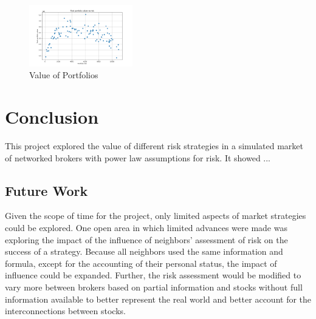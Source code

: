 \documentclass[letterpaper, 10 pt, proceedings]{ieeetran}
\begin{document}
	\begin{figure}[h]
		\centering
		\includegraphics[width=0.4\textwidth]{valueToRisk.png}
		\caption{Value of Portfolios}
		\label{RV}
	\end{figure}
	\FloatBarrier

	
	
	
	
	
	\section{Conclusion}\label{sec:conclusion}
	This project explored the value of different risk strategies in a simulated market of networked brokers with power law assumptions for risk. It showed ...
	
	\subsection{Future Work}\label{subsec:futurework}
	Given the scope of time for the project, only limited aspects of market strategies could be explored. One open area in which limited advances were made was exploring the impact of the influence of neighbors' assessment of risk on the success of a strategy. Because all neighbors used the same information and formula, except for the accounting of their personal status, the impact of influence could be expanded. Further, the risk assessment would be modified to vary more between brokers based on partial information and stocks without full information available to better represent the real world and better account for the interconnections between stocks. 
\end{document}
